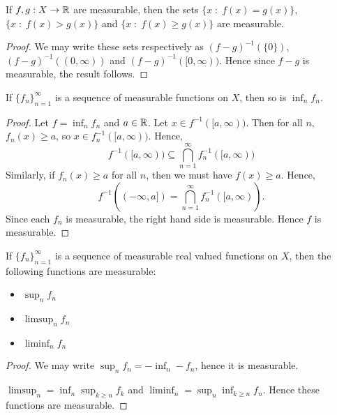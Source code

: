 \documentclass{unswmaths}
\begin{document}
\begin{lemma}
    If $f,g:X\rightarrow\mathbb{R}$ are measurable, then the sets $\{x\;:\;f(x) = g(x)\}$,
    $\{x\;:\;f(x) > g(x)\}$ and $\{x\;:\;f(x) \geq g(x)\}$ are measurable.
\end{lemma}
\begin{proof}
    We may write these sets respectively as $(f-g)^{-1}(\{0\})$,
    $(f-g)^{-1}((0,\infty))$ and $(f-g)^{-1}([0,\infty))$.
    Hence since $f-g$ is measurable, the result follows.
\end{proof}

\begin{lemma}
    If $\{f_n\}_{n=1}^\infty$ is a sequence of measurable functions on $X$, then so is
    $\inf_{n} f_n$.
\end{lemma}
\begin{proof}
    Let $f = \inf_{n} f_n$ and $a \in \mathbb{R}$. Let $x \in f^{-1}([a,\infty))$.
    Then for all $n$, $f_n(x) \geq a$, so $x \in f_n^{-1}([a,\infty))$.
    Hence,
    \begin{equation*}
        f^{-1}([a,\infty)) \subseteq \bigcap_{n=1}^\infty f_n^{-1}([a,\infty))
    \end{equation*}
    Similarly, if $f_n(x) \geq a$ for all $n$, then we must have $f(x) \geq a$. Hence,
    \begin{equation*}
        f^{-1}((-\infty,a]) = \bigcap_{n=1}^\infty f_n^{-1}([a,\infty)).
    \end{equation*}
    Since each $f_n$ is measurable, the right hand side is measurable. Hence $f$ is measurable.
\end{proof}
\begin{corollary}
    If $\{f_n\}_{n=1}^\infty$ is a sequence of measurable real valued functions on $X$, then
    the following functions are measurable:
    \begin{itemize}
        \item{} $\sup_{n} f_n$
        \item{} $\limsup_{n} f_n$
        \item{} $\liminf_{n} f_n$
    \end{itemize}
\end{corollary}
\begin{proof}
    We may write $\sup_{n} f_n = -\inf_{n} -f_n$, hence it is measurable.
    
    $\limsup_n = \inf_{n} \sup_{k\geq n} f_k$ and $\liminf_{n} = \sup_{n}\inf_{k\geq n} f_n$.
    Hence these functions are measurable.
\end{proof}
\end{document}
